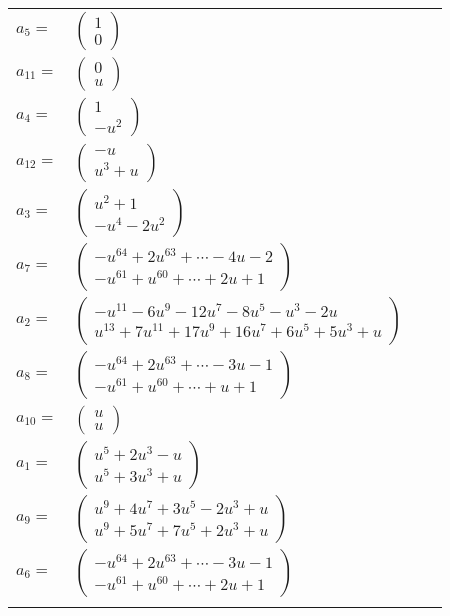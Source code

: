 \documentclass[1p]{elsarticle_modified}
\theoremstyle{definition}
\begin{document}
\begin{tabular}{m{7pt} m{180pt} m{7pt} m{180pt} }
\flushright $a_{5}=$&$\begin{pmatrix}1\\0\end{pmatrix}$ \\
\flushright $a_{11}=$&$\begin{pmatrix}0\\u\end{pmatrix}$ \\
\flushright $a_{4}=$&$\begin{pmatrix}1\\- u^2\end{pmatrix}$ \\
\flushright $a_{12}=$&$\begin{pmatrix}- u\\u^3+u\end{pmatrix}$ \\
\flushright $a_{3}=$&$\begin{pmatrix}u^2+1\\- u^4-2 u^2\end{pmatrix}$ \\
\flushright $a_{7}=$&$\begin{pmatrix}- u^{64}+2 u^{63}+\cdots-4 u-2\\- u^{61}+u^{60}+\cdots+2 u+1\end{pmatrix}$ \\
\flushright $a_{2}=$&$\begin{pmatrix}- u^{11}-6 u^9-12 u^7-8 u^5- u^3-2 u\\u^{13}+7 u^{11}+17 u^9+16 u^7+6 u^5+5 u^3+u\end{pmatrix}$ \\
\flushright $a_{8}=$&$\begin{pmatrix}- u^{64}+2 u^{63}+\cdots-3 u-1\\- u^{61}+u^{60}+\cdots+u+1\end{pmatrix}$ \\
\flushright $a_{10}=$&$\begin{pmatrix}u\\u\end{pmatrix}$ \\
\flushright $a_{1}=$&$\begin{pmatrix}u^5+2 u^3- u\\u^5+3 u^3+u\end{pmatrix}$ \\
\flushright $a_{9}=$&$\begin{pmatrix}u^9+4 u^7+3 u^5-2 u^3+u\\u^9+5 u^7+7 u^5+2 u^3+u\end{pmatrix}$ \\
\flushright $a_{6}=$&$\begin{pmatrix}- u^{64}+2 u^{63}+\cdots-3 u-1\\- u^{61}+u^{60}+\cdots+2 u+1\end{pmatrix}$\\&\end{tabular}
\end{document}

